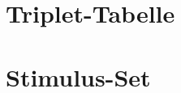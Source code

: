 \cite{Test}

\newpage



\clearpage
\appendix
{} %
\renewcommand*{\thesection}{\Alph{section}}
\section{Triplet-Tabelle}
\label{whatever}

\section{Stimulus-Set}
\label{whateverb}

\clearpage


